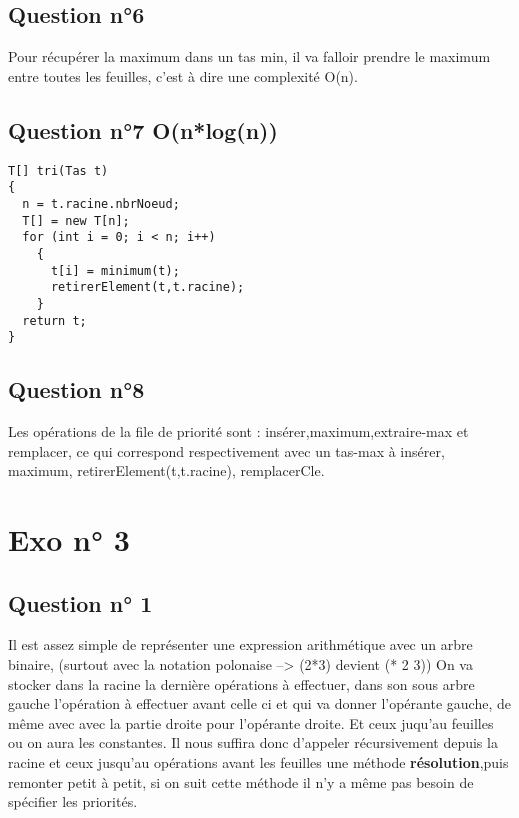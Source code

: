 \documentclass[11pt]{article}
\begin{document}
\subsection{Question n°6}
\label{sec:orgd5d03ac}

Pour récupérer la maximum dans un tas min, il va falloir prendre le maximum entre toutes les feuilles, c'est à dire une complexité O(n).

\subsection{Question n°7 O(n*log(n))}
\label{sec:orga03d8e9}

\begin{lstlisting}
T[] tri(Tas t)
{
  n = t.racine.nbrNoeud;
  T[] = new T[n];
  for (int i = 0; i < n; i++)
    {
      t[i] = minimum(t);
      retirerElement(t,t.racine);
    }
  return t;
}
\end{lstlisting}


\subsection{Question n°8}
\label{sec:org7110faf}

Les opérations de la file de priorité sont : insérer,maximum,extraire-max et remplacer, ce qui correspond respectivement avec un tas-max à insérer, maximum, retirerElement(t,t.racine), remplacerCle. 

\section{Exo n° 3}
\label{sec:org58ea2d2}

\subsection{Question n° 1}
\label{sec:orga220405}

Il est assez simple de représenter une expression arithmétique avec un arbre binaire, (surtout avec la notation polonaise --> (2*3) devient (* 2 3)) On va stocker dans la racine la dernière opérations à effectuer, dans son sous arbre gauche l'opération à effectuer avant celle ci et qui va donner l'opérante gauche, de même avec avec la partie droite pour l'opérante droite. Et ceux juqu'au feuilles ou on aura les constantes. Il nous suffira donc d'appeler récursivement depuis la racine et ceux jusqu'au opérations avant les feuilles une méthode \textbf{résolution},puis remonter petit à petit, si on suit cette méthode il n'y a même pas besoin de spécifier les priorités.
\end{document}
